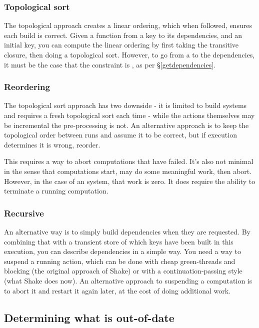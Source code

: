 \subsubsection{Topological sort}

The topological approach creates a linear ordering, which when followed, ensures each build is correct. Given a function from a key to its dependencies, and an initial key, you can compute the linear ordering by first taking the transitive closure, then doing a topological sort. However, to go from a  to the dependencies, it must be the case that the constraint is , as per \S\ref{getdependencies}.

\subsubsection{Reordering}

The topological sort approach has two downside - it is limited to  build systems and requires a fresh topological sort each time - while the actions themselves may be incremental the pre-processing is not. An alternative approach is to keep the topological order between runs and assume it to be correct, but if execution determines it is wrong, reorder.

This requires a way to abort computations that have failed. It's also not minimal in the sense that computations start, may do some meaningful work, then abort. However, in the case of an  system, that work is zero. It does require the ability to terminate a running computation.

\subsubsection{Recursive}

An alternative way is to simply build dependencies when they are requested. By combining that with a transient store of which keys have been built in this execution, you can describe dependencies in a simple way. You need a way to suspend a running action, which can be done with cheap green-threads and blocking (the original approach of Shake) or with a continuation-passing style (what Shake does now). An alternative approach to suspending a computation is to abort it and restart it again later, at the cost of doing additional work.


\subsection{Determining what is out-of-date}

